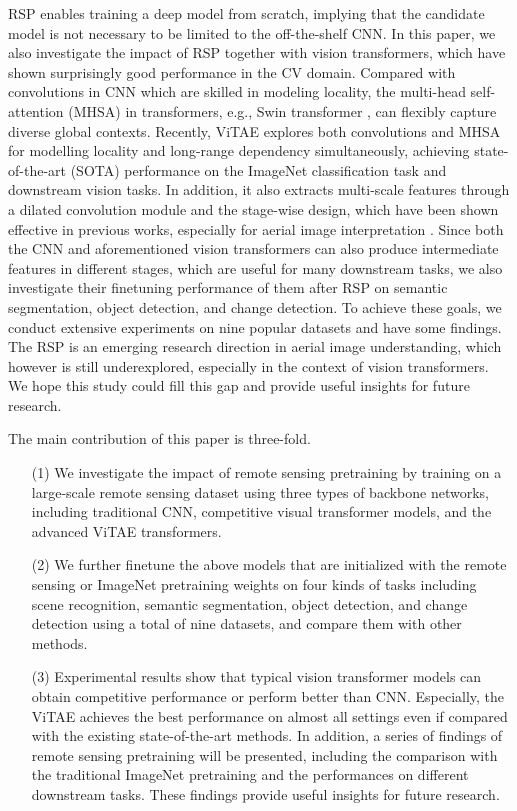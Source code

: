 \documentclass[10pt, journal,twoside]{IEEEtran}
\begin{document}
RSP enables training a deep model from scratch, implying that the candidate model is not necessary to be limited to the off-the-shelf CNN. In this paper, we also investigate the impact of RSP together with vision transformers, which have shown surprisingly good performance in the CV domain. Compared with convolutions in CNN which are skilled in modeling locality, the multi-head self-attention (MHSA) in transformers, e.g., Swin transformer \cite{swint}, can flexibly capture diverse global contexts. Recently, ViTAE \cite{xu2021vitae,vitae_v2} explores both convolutions and MHSA for modelling locality and long-range dependency simultaneously, achieving state-of-the-art (SOTA) performance on the ImageNet classification task and downstream vision tasks. In addition, it also extracts multi-scale features through a dilated convolution module and the stage-wise design, which have been shown effective in previous works, especially for aerial image interpretation \cite{wang_2021_asr_efpn}. Since both the CNN and aforementioned vision transformers can also produce intermediate features in different stages, which are useful for many downstream tasks, we also investigate their finetuning performance of them after RSP on semantic segmentation, object detection, and change detection. To achieve these goals, we conduct extensive experiments on nine popular datasets and have some findings. The RSP is an emerging research direction in aerial image understanding, which however is still underexplored, especially in the context of vision transformers. We hope this study could fill this gap and provide useful insights for future research.

The main contribution of this paper is three-fold.


\begin{itemize}
  
  \item[(1)] We investigate the impact of remote sensing pretraining by training on a large-scale remote sensing dataset using three types of backbone networks, including traditional CNN, competitive visual transformer models, and the advanced ViTAE transformers.
  \item[(2)] We further finetune the above models that are initialized with the remote sensing or ImageNet pretraining weights on four kinds of tasks including scene recognition, semantic segmentation, object detection, and change detection using a total of nine datasets, and compare them with other methods.
  \item[(3)] Experimental results show that typical vision transformer models can obtain competitive performance or perform better than CNN. Especially, the ViTAE achieves the best performance on almost all settings even if compared with the existing state-of-the-art methods. In addition, a series of findings of remote sensing pretraining will be presented, including the comparison with the traditional ImageNet pretraining and the performances on different downstream tasks. These findings provide useful insights for future research.
 \end{itemize}
\end{document}
